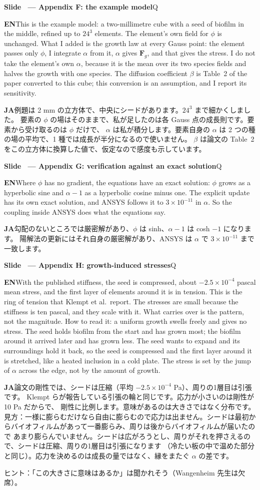 \documentclass[11pt,a4paper]{article}
\newcounter{sl}
\newcommand{\slide}[2]{\stepcounter{sl}\vspace{8pt}%
  {\color{c3}\large\bfseries Slide \thesl\ --- #1}\hfill{\small #2}\par\vspace{2pt}}
\newcommand{\EN}{\textbf{EN}\quad}
\newcommand{\JA}{\par\textbf{JA}\quad}
\newcommand{\hint}[1]{\par{\color{gray}\small ヒント：#1}}
\begin{document}
\slide{Appendix F: the example model}{Q}
\EN This is the example model: a two-millimetre cube with a seed of biofilm
in the middle, refined up to $24^3$ elements. The element's own field for
$\phi$ is unchanged. What I added is the growth law at every Gauss point:
the element passes only $\phi$, I integrate $\alpha$ from it, $\alpha$ gives $\mathbf F_g$, and that
gives the stress. I do not take the element's own $\alpha$, because it is the mean over its two species
fields and halves the growth with one species.
The diffusion coefficient $\beta$ is Table~2 of the paper converted to this
cube; this conversion is an assumption, and I report its sensitivity.
\JA 例題は 2 mm の立方体で、中央にシードがあります。$24^3$ まで細かくしました。
要素の $\phi$ の場はそのままで、私が足したのは各 Gauss 点の成長則です。要素から受け取るのは $\phi$ だけで、
$\alpha$ は私が積分します。要素自身の $\alpha$ は 2 つの種の場の平均で、1 種では成長が半分になるので使いません。
$\beta$ は論文の Table~2 をこの立方体に換算した値で、仮定なので感度も示しています。

\slide{Appendix G: verification against an exact solution}{Q}
\EN Where $\phi$ has no gradient, the equations have an exact solution:
$\phi$ grows as a hyperbolic sine and $\alpha-1$ as a hyperbolic cosine minus
one. The explicit update has its own exact solution, and ANSYS follows it to
$3\times10^{-11}$ in $\alpha$. So the coupling inside ANSYS does what the
equations say.
\JA 勾配のないところでは厳密解があり、$\phi$ は sinh、$\alpha-1$ は cosh $-1$ になります。
陽解法の更新にはそれ自身の厳密解があり、ANSYS は $\alpha$ で $3\times10^{-11}$ まで一致します。

\slide{Appendix H: growth-induced stresses}{Q}
\EN With the published stiffness, the seed is compressed, about
$-2.5\times10^{-4}$ pascal mean stress, and the first layer of elements around
it is in tension. This is the ring of tension that Klempt et al.\ report.
The stresses are small because the stiffness is ten pascal, and they scale
with it. What carries over is the pattern, not the magnitude.
How to read it: a uniform growth swells freely and gives no stress. The seed holds biofilm from the start and has
grown most; the biofilm around it arrived later and has grown less. The seed wants to expand and its surroundings
hold it back, so the seed is compressed and the first layer around it is stretched, like a heated inclusion in a
cold plate. The stress is set by the jump of $\alpha$ across the edge, not by the amount of growth.
\JA 論文の剛性では、シードは圧縮（平均 $-2.5\times10^{-4}$ Pa）、周りの1層目は引張です。
Klempt らが報告している引張の輪と同じです。応力が小さいのは剛性が 10 Pa だからで、
剛性に比例します。意味があるのは大きさではなく分布です。
見方：一様に膨らむだけなら自由に膨らむので応力は出ません。シードは最初からバイオフィルムがあって一番膨らみ、周りは後からバイオフィルムが届いたので
あまり膨らんでいません。シードは広がろうとし、周りがそれを押さえるので、シードは圧縮、周りの1層目は引張になります
（冷たい板の中で温めた部分と同じ）。応力を決めるのは成長の量ではなく、縁をまたぐ $\alpha$ の差です。
\hint{「この大きさに意味はあるか」は聞かれそう（Wangenheim 先生は欠席）。}
\end{document}
